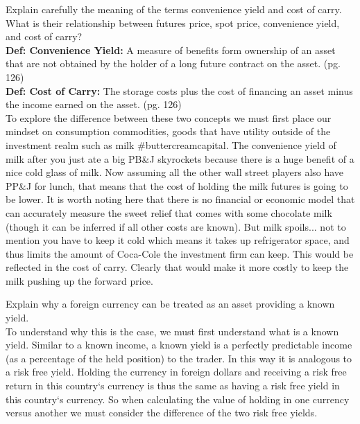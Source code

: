 \documentclass[12pt]{article}
\newenvironment{problem}[3][Problem]{\begin{trivlist}
\item[\hskip \labelsep {\bfseries #1}\hskip \labelsep {\bfseries #2.}]}{\end{trivlist}}
\begin{document}
\begin{problem}{5.6}. Explain carefully the meaning of the terms convenience yield and cost of carry. What is their relationship between futures price, spot price, convenience yield, and cost of carry? \\
\textbf{Def: Convenience Yield:} A measure of benefits form ownership of an asset that are not obtained by the holder of a long future contract on the asset. (pg. 126) \\
\textbf{Def: Cost of Carry:} The storage costs plus the cost of financing an asset minus the income earned on the asset. (pg. 126) \\
To explore the difference between these two concepts we must first place our mindset on consumption commodities, goods that have utility outside of the investment realm such as milk \#buttercreamcapital. The convenience yield of milk after you just ate a big PB\&J skyrockets because there is a huge benefit of a nice cold glass of milk. Now assuming all the other wall street players also have PP\&J for lunch, that means that the cost of holding the milk futures is going to be lower. It is worth noting here that there is no financial or economic model that can accurately measure the sweet relief that comes with some chocolate milk (though it can be inferred if all other costs are known). But milk spoils... not to mention you have to keep it cold which means it takes up refrigerator space, and thus limits the amount of Coca-Cole the investment firm can keep. This would be reflected in the cost of carry. Clearly that would make it more costly to keep the milk pushing up the forward price.  
\end{problem}


\begin{problem}{5.7}. Explain why a foreign currency can be treated as an asset providing a known yield. \\
To understand why this is the case, we must first understand what is a known yield. Similar to a known income, a known yield is a perfectly predictable income (as a percentage of the held position) to the trader. In this way it is analogous to a risk free yield. Holding the currency in foreign dollars and receiving a risk free return in this country`s currency is thus the same as having a risk free yield in this country`s currency. So when calculating the value of holding in one currency versus another we must consider the difference of the two risk free yields. 
\end{problem}
\end{document}
